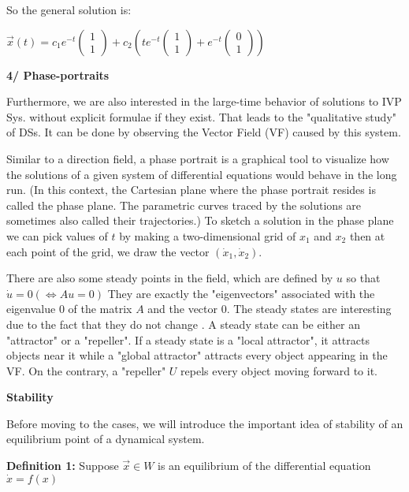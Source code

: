 \documentclass[a4paper]{article}
\begin{document}
So the general solution is:

$\vec{x}(t)=c_{1} e^{-t}\left(\begin{array}{l}1 \\ 1\end{array}\right)+c_{2}\left(t e^{-t}\left(\begin{array}{l}1 \\ 1\end{array}\right)+e^{-t}\left(\begin{array}{l}0 \\ 1\end{array}\right)\right)$

{\bf  4/ Phase-portraits}

Furthermore, we are also interested in the large-time behavior of solutions to IVP Sys. without explicit formulae if they exist. That leads to the "qualitative study" of DSs. It can be done by observing the Vector Field (VF) caused by this system.

Similar to a direction field, a phase portrait is a graphical tool to visualize how the solutions of a given system of differential equations would behave in the long run. (In this context, the Cartesian plane where the phase portrait resides is called the phase plane. The parametric curves traced by the solutions are sometimes also called their trajectories.) To sketch a solution in the phase plane we can pick values of $t$ by making a two-dimensional grid of $x_{1}$ and $x_{2}$ then at each point of the grid, we draw the vector $\left(\dot{x}_{1}, \dot{x}_{2}\right)$.

There are also some steady points in the field, which are defined by $u$ so that $\dot{u}=0(\Leftrightarrow A u=0)$ They are exactly the "eigenvectors" associated with the eigenvalue 0 of the matrix $A$ and the vector 0. The steady states are interesting due to the fact that they do not change . A steady state can be either an "attractor" or a "repeller". If a steady state is a "local attractor", it attracts objects near it while a "global attractor" attracts every object appearing in the VF. On the contrary, a "repeller" $U$ repels every object moving forward to it.

{\bf  Stability}

Before moving to the cases, we will introduce the important idea of stability of an equilibrium point of a dynamical system.

\textbf{Definition 1:} Suppose $\vec{x} \in W$ is an equilibrium of the differential equation $\dot{x}=f(x)$
\end{document}
